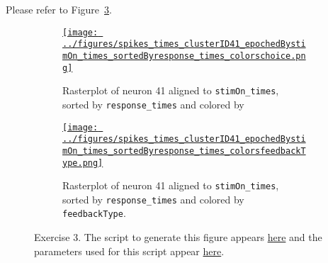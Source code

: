 \documentclass{article}
\def\fig_width{3.5in}
\begin{document}
Please refer to Figure~\ref{fig:ex3}.

\begin{figure}[H]
    \begin{center}

        \begin{subfigure}{1.0\textwidth}
            \centering
            \href{https://www.gatsby.ucl.ac.uk/~rapela/neuroinformatics/2023/ws1/figures/spikes_times_clusterID41_epochedBystimOn_times_sortedByresponse_times_colorschoice.html}{\texttt{[image: ../figures/spikes\_times\_clusterID41\_epochedBystimOn\_times\_sortedByresponse\_times\_colorschoice.png]}}

            \caption{Rasterplot of neuron 41 aligned to
            \texttt{stimOn\_times},
            sorted by
            \texttt{response\_times}
            and colored by
            }

            \label{fig:ex3_1}
        \end{subfigure}

        \begin{subfigure}{1.0\textwidth}
            \centering
            \href{https://www.gatsby.ucl.ac.uk/~rapela/neuroinformatics/2023/ws1/figures/spikes_times_clusterID41_epochedBystimOn_times_sortedByresponse_times_colorsfeedbackType.html}{\texttt{[image: ../figures/spikes\_times\_clusterID41\_epochedBystimOn\_times\_sortedByresponse\_times\_colorsfeedbackType.png]}}

            \caption{Rasterplot of neuron 41 aligned to
            \texttt{stimOn\_times},
            sorted by
            \texttt{response\_times}
            and colored by
            \texttt{feedbackType}.
            }

            \label{fig:ex3_2}
        \end{subfigure}

        \caption{Exercise 3. The script to generate this figure appears
        \href{https://github.com/joacorapela/neuroinformatics23/blob/master/worksheets/ws1/mySolution/code/scripts/doPlotEpochedSpikesTimes.py}{here}
        and the parameters used for this script appear
        \href{https://github.com/joacorapela/neuroinformatics23/blob/master/worksheets/ws1/mySolution/code/scripts/doPlotEpochedSpikesTimes.csh}{here}.
        }

        \label{fig:ex3}


    \end{center}
\end{figure}
\end{document}

